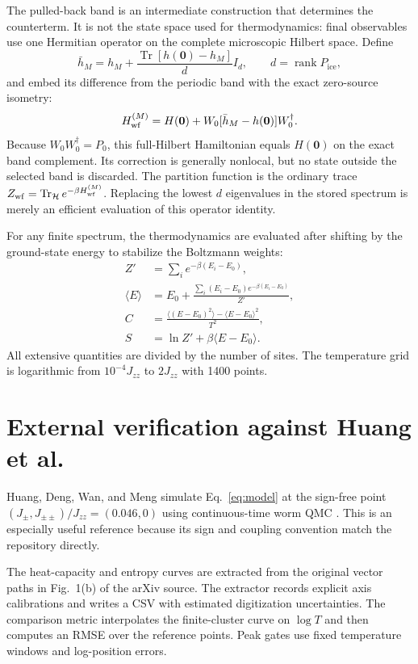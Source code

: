 \documentclass[11pt]{article}
\newcommand{\Jzz}{J_{zz}}
\newcommand{\Jpm}{J_{\pm}}
\newcommand{\Jpp}{J_{\pm\pm}}
\newcommand{\Pice}{P_{\mathrm{ice}}}
\begin{document}
The pulled-back band is an intermediate construction that determines the
counterterm.  It is not the state space used for thermodynamics: final
observables use one Hermitian operator on the complete microscopic Hilbert
space.  Define
\begin{equation}
 \bar h_M=h_M+\frac{\operatorname{Tr}[h(\bm0)-h_M]}{d}I_d,
 \qquad d=\operatorname{rank}\Pice,
\end{equation}
and embed its difference from the periodic band with the exact zero-source
isometry:
\begin{equation}
 H_{\rm wf}^{(M)}=H(\bm0)+W_0[\bar h_M-h(\bm0)]W_0^\dagger.
 \label{eq:fullhamiltonian}
\end{equation}
Because $W_0W_0^\dagger=P_0$, this full-Hilbert Hamiltonian equals $H(\bm0)$
on the exact band complement.  Its correction is generally nonlocal, but no
state outside the selected band is discarded.  The partition function is the
ordinary trace $Z_{\rm wf}=\operatorname{Tr}_{\mathcal H}
e^{-\beta H_{\rm wf}^{(M)}}$.  Replacing the lowest $d$ eigenvalues in the
stored spectrum is merely an efficient evaluation of this operator identity.

For any finite spectrum, the thermodynamics are evaluated after shifting by
the ground-state energy to stabilize the Boltzmann weights:
\begin{align}
 Z'&=\sum_i e^{-\beta(E_i-E_0)},\\
 \langle E\rangle&=E_0+
 \frac{\sum_i(E_i-E_0)e^{-\beta(E_i-E_0)}}{Z'},\\
 C&=\frac{\langle(E-E_0)^2\rangle-
 \langle E-E_0\rangle^2}{T^2},\\
 S&=\ln Z'+\beta\langle E-E_0\rangle.
\end{align}
All extensive quantities are divided by the number of sites.  The temperature
grid is logarithmic from $10^{-4}\Jzz$ to $2\Jzz$ with 1400 points.

\section{External verification against Huang et al.}

Huang, Deng, Wan, and Meng simulate Eq.~\eqref{eq:model} at the sign-free
point $(\Jpm,\Jpp)/\Jzz=(0.046,0)$ using continuous-time worm QMC
\cite{Huang2018}.  This is an especially useful reference because its sign
and coupling convention match the repository directly.

The heat-capacity and entropy curves are extracted from the original vector
paths in Fig.~1(b) of the arXiv source.  The extractor records explicit axis
calibrations and writes a CSV with estimated digitization uncertainties.  The
comparison metric interpolates the finite-cluster curve on $\log T$ and then
computes an RMSE over the reference points.  Peak gates use fixed temperature
windows and log-position errors.
\end{document}

